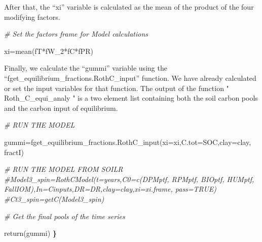 \documentclass[
  10pt,
  b5paper,
]{book}
\newenvironment{Shaded}{\begin{snugshade}}{\end{snugshade}}
\newcommand{\AttributeTok}[1]{\textcolor[rgb]{0.77,0.63,0.00}{#1}}
\newcommand{\CommentTok}[1]{\textcolor[rgb]{0.56,0.35,0.01}{\textit{#1}}}
\newcommand{\DecValTok}[1]{\textcolor[rgb]{0.00,0.00,0.81}{#1}}
\newcommand{\ErrorTok}[1]{\textcolor[rgb]{0.64,0.00,0.00}{\textbf{#1}}}
\newcommand{\FunctionTok}[1]{\textcolor[rgb]{0.00,0.00,0.00}{#1}}
\newcommand{\NormalTok}[1]{#1}
\newcommand{\OtherTok}[1]{\textcolor[rgb]{0.56,0.35,0.01}{#1}}
\newcommand{\SpecialCharTok}[1]{\textcolor[rgb]{0.00,0.00,0.00}{#1}}
\begin{document}
\begin{Shaded}
\end{Shaded}

After that, the ``xi'' variable is calculated as the mean of the product of the four modifying factors.

\begin{Shaded}
\begin{Highlighting}[]
  \CommentTok{\# Set the factors frame for Model calculations}

\NormalTok{  xi}\OtherTok{=}\FunctionTok{mean}\NormalTok{(fT}\SpecialCharTok{*}\NormalTok{fW\_2}\SpecialCharTok{*}\NormalTok{fC}\SpecialCharTok{*}\NormalTok{fPR)}
\end{Highlighting}
\end{Shaded}

Finally, we calculate the ``gummi'' variable using the ``fget\_equilibrium\_fractions.RothC\_input'' function. We have already calculated or set the input variables for that function.
The output of the function " Roth\_C\_equi\_analy " is a two element list containing both the soil carbon pools and the carbon input of equilibrium.

\begin{Shaded}
\begin{Highlighting}[]
\CommentTok{\# RUN THE MODEL }
  
\NormalTok{  gummi}\OtherTok{=}\FunctionTok{fget\_equilibrium\_fractions.RothC\_input}\NormalTok{(}\AttributeTok{xi=}\NormalTok{xi,}\AttributeTok{C.tot=}\NormalTok{SOC,}\AttributeTok{clay=}\NormalTok{clay, fractI)}
  
  \CommentTok{\# RUN THE MODEL FROM SOILR}
  \CommentTok{\#Model3\_spin=RothCModel(t=years,C0=c(DPMptf, RPMptf, BIOptf, HUMptf, FallIOM),In=Cinputs,DR=DR,clay=clay,xi=xi.frame, pass=TRUE) }
  \CommentTok{\#Ct3\_spin=getC(Model3\_spin)}
  
  \CommentTok{\# Get the final pools of the time series}
 
  
  \FunctionTok{return}\NormalTok{(gummi)}
\ErrorTok{\}}
\end{Highlighting}
\end{Shaded}
\end{document}
